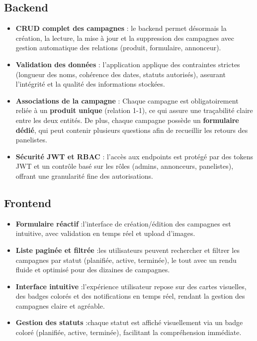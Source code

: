 \subsection{Backend}
\begin{itemize}[label=\textbullet]
    \item \textbf{CRUD complet des campagnes} : \newline le backend permet désormais la création, la lecture, la mise à jour et la suppression
    des campagnes avec gestion automatique des relations (produit, formulaire, annonceur).
    \item \textbf{Validation des données} : \newline l’application applique des contraintes strictes (longueur des noms, cohérence des dates, statuts autorisés),
    assurant l’intégrité et la qualité des informations stockées.
    \item \textbf{Associations de la campagne} : \newline
Chaque campagne est obligatoirement reliée à un \textbf{produit unique} (relation 1-1), ce qui assure une traçabilité claire entre les deux entités.
\newline De plus, chaque campagne possède un \textbf{formulaire dédié}, qui peut contenir plusieurs questions afin de recueillir les retours des panelistes.

    \item \textbf{Sécurité JWT et RBAC} : \newline  l’accès aux endpoints est protégé par des tokens JWT et un contrôle basé sur les rôles (admins, annonceurs, panelistes),
    offrant une granularité fine des autorisations.
\end{itemize}

\subsection{Frontend}
\begin{itemize}[label=\textbullet]
    \item \textbf{Formulaire réactif} :\newline l’interface de création/édition des campagnes est intuitive, avec validation en temps réel et
    upload d’images.
    \item \textbf{Liste paginée et filtrée} :\newline les utilisateurs peuvent rechercher et filtrer les campagnes par statut (planifiée, active, terminée),
    le tout avec un rendu fluide et optimisé pour des dizaines de campagnes.
    \item \textbf{Interface intuitive} :\newline l’expérience utilisateur repose sur des cartes visuelles, des badges colorés et des notifications en temps réel,
    rendant la gestion des campagnes claire et agréable.
    \item \textbf{Gestion des statuts} :\newline chaque statut est affiché visuellement via un badge coloré
    (planifiée, active, terminée), facilitant la compréhension immédiate.

\end{itemize}

